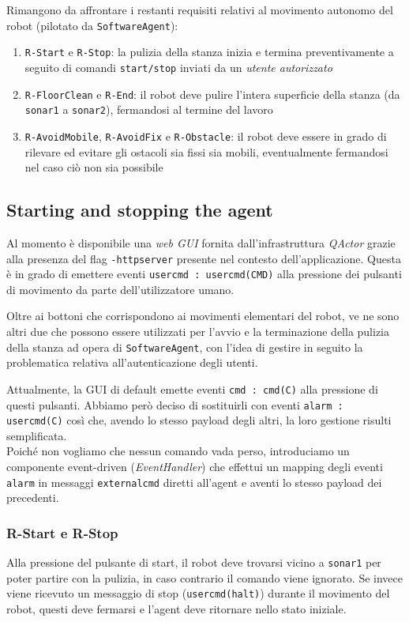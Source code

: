 \documentclass{../llncs}
\newcommand{\codescript}[1]{{\mbox{\small{\texttt{#1}}}}\xspace}
\newcommand{\code}[1]{{\color{blue}\small{\texttt{#1}}}}
\newcommand{\qa}{\textsf{\textit{QActor}}\xspace}
\begin{document}
Rimangono da affrontare i restanti requisiti relativi al movimento autonomo del robot (pilotato da \texttt{SoftwareAgent}):
\begin{enumerate}
\item \code{R-Start} e \code{R-Stop}: la pulizia della stanza inizia e termina preventivamente a seguito di comandi \texttt{start/stop} inviati da un \emph{utente autorizzato}
\item \code{R-FloorClean} e \code{R-End}: il robot deve pulire l'intera superficie della stanza (da \code{sonar1} a \code{sonar2}), fermandosi al termine del lavoro
\item \code{R-AvoidMobile}, \code{R-AvoidFix} e \code{R-Obstacle}: il robot deve essere in grado di rilevare ed evitare gli ostacoli sia fissi sia mobili, eventualmente fermandosi nel caso ciò non sia possibile
\end{enumerate}

\subsection{Starting and stopping the agent}
Al momento è disponibile una \emph{web GUI} fornita dall'infrastruttura \qa grazie alla presenza del flag \codescript{-httpserver} presente nel contesto dell'applicazione. Questa è in grado di emettere eventi \codescript{usercmd : usercmd(CMD)} alla pressione dei pulsanti di movimento da parte dell'utilizzatore umano.

Oltre ai bottoni che corrispondono ai movimenti elementari del robot, ve ne sono altri due che possono essere utilizzati per l'avvio e la terminazione della pulizia della stanza ad opera di \texttt{SoftwareAgent}, con l'idea di gestire in seguito la problematica relativa all'autenticazione degli utenti.

Attualmente, la GUI di default emette eventi \codescript{cmd : cmd(C)} alla pressione di questi pulsanti. Abbiamo però deciso di sostituirli con eventi \codescript{alarm : usercmd(C)} così che, avendo lo stesso payload degli altri, la loro gestione risulti semplificata.\\

Poiché non vogliamo che nessun comando vada perso, introduciamo un componente event-driven (\emph{EventHandler}) che effettui un mapping degli eventi \codescript{alarm} in messaggi \codescript{externalcmd} diretti all'agent e aventi lo stesso payload dei precedenti.

\subsubsection{R-Start e R-Stop}
Alla pressione del pulsante di start, il robot deve trovarsi vicino a \code{sonar1} per poter partire con la pulizia, in caso contrario il comando viene ignorato. Se invece viene ricevuto un messaggio di stop (\codescript{usercmd(halt)}) durante il movimento del robot, questi deve fermarsi e l'agent deve ritornare nello stato iniziale.\\
\end{document}
